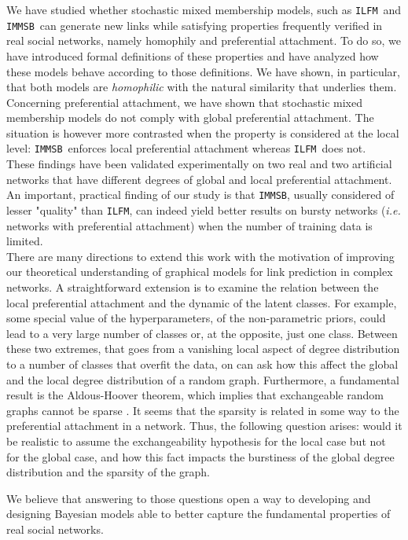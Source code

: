 \documentclass[journal]{IEEEtran}
\newcommand{\ifm}{\texttt{ILFM}}
\newcommand{\imb}{\texttt{IMMSB}}
\begin{document}
We have studied whether stochastic mixed membership models, such as \ifm\ and \imb\, can generate new links while satisfying properties frequently verified in real  social networks, namely homophily and preferential attachment. To do so, we have introduced formal definitions of these properties and have analyzed how these models behave according to those definitions. We have shown, in particular, that both models are \textit{homophilic} with the natural similarity that underlies them. Concerning preferential attachment, we have shown that stochastic mixed membership models do not comply with global preferential attachment. The situation is however more contrasted when the property is considered at the local level: \imb\ enforces local preferential attachment whereas \ifm\ does not.~\\

These findings have been validated experimentally on two real and two artificial networks that have different degrees of global and local preferential attachment. An important, practical finding of our study is that \imb, usually considered of lesser "quality" than \ifm, can indeed yield better results on bursty networks (\textit{i.e.} networks with preferential attachment) when the number of training data is limited.~\\

There are many directions to extend this work with the motivation of improving our theoretical understanding of graphical models for link prediction in complex networks. A straightforward extension is to examine the relation between the local preferential attachment and the dynamic of the latent classes. For example, some special value of the hyperparameters, of the non-parametric priors, could lead to a very large number of classes or, at the opposite, just one class. Between these two extremes, that goes from a vanishing local aspect of degree distribution to a number of classes that overfit the data, on can ask how this affect the global and the local degree distribution of a random graph. Furthermore, a fundamental result is the Aldous-Hoover theorem, which implies that exchangeable random graphs cannot be sparse \cite{orbanz2015bayesian}. It seems that the sparsity is related in some way to the preferential attachment in a network. Thus, the following question arises: would it be realistic to assume the exchangeability hypothesis for the local case but not for the global case, and how this fact impacts the burstiness of the global degree distribution and the sparsity of the graph.

We believe that answering to those questions open a way to  developing and designing Bayesian models able to better capture the fundamental properties of  real social networks.




\end{document}
